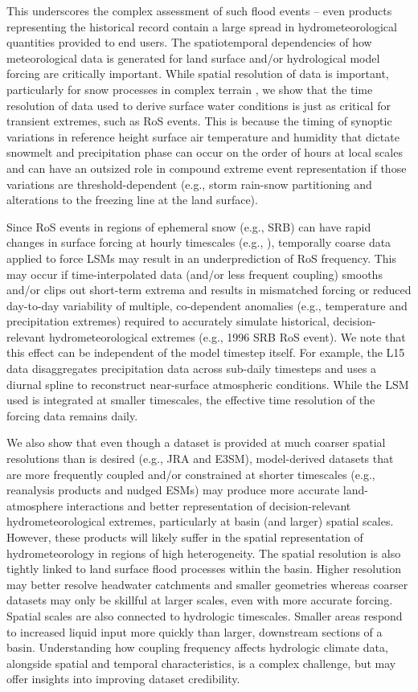 \documentclass[nhess, manuscript]{copernicus}
\begin{document}
This underscores the complex assessment of such flood events -- even products representing the historical record contain a large spread in hydrometeorological quantities provided to end users. The spatiotemporal dependencies of how meteorological data is generated for land surface and/or hydrological model forcing are critically important.
While spatial resolution of data is important, particularly for snow processes in complex terrain \citep{henn2018an,Woodburn2021}, we show that the time resolution of data used to derive surface water conditions is just as critical for transient extremes, such as RoS events.
This is because the timing of synoptic variations in reference height surface air temperature and humidity that dictate snowmelt and precipitation phase can occur on the order of hours at local scales and can have an outsized role in compound extreme event representation if those variations are threshold-dependent (e.g., storm rain-snow partitioning and alterations to the freezing line at the land surface).

Since RoS events in regions of ephemeral snow (e.g., SRB) can have rapid changes in surface forcing at hourly timescales (e.g., \citet{leathers1998severe}), temporally coarse data applied to force LSMs may result in an underprediction of RoS frequency.
This may occur if time-interpolated data (and/or less frequent coupling) smooths and/or clips out short-term extrema and results in mismatched forcing or reduced day-to-day variability of multiple, co-dependent anomalies (e.g., temperature and precipitation extremes) required to accurately simulate historical, decision-relevant hydrometeorological extremes (e.g., 1996 SRB RoS event). We note that this effect can be independent of the model timestep itself. For example, the L15 data disaggregates precipitation data across sub-daily timesteps and uses a diurnal spline to reconstruct near-surface atmospheric conditions. While the LSM used is integrated at smaller timescales, the effective time resolution of the forcing data remains daily.

We also show that even though a dataset is provided at much coarser spatial resolutions than is desired (e.g., JRA and E3SM), model-derived datasets that are more frequently coupled and/or constrained at shorter timescales (e.g., reanalysis products and nudged ESMs) may produce more accurate land-atmosphere interactions and better representation of decision-relevant hydrometeorological extremes, particularly at basin (and larger) spatial scales. However, these products will likely suffer in the spatial representation of hydrometeorology in regions of high heterogeneity. The spatial resolution is also tightly linked to land surface flood processes within the basin. Higher resolution may better resolve headwater catchments and smaller geometries whereas coarser datasets may only be skillful at larger scales, even with more accurate forcing. Spatial scales are also connected to hydrologic timescales. Smaller areas respond to increased liquid input more quickly than larger, downstream sections of a basin. Understanding how coupling frequency affects hydrologic climate data, alongside spatial and temporal characteristics, is a complex challenge, but may offer insights into improving dataset credibility.
\end{document}
